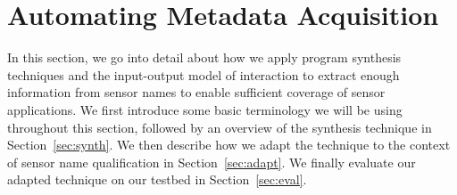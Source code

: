 \section{Automating Metadata Acquisition}
%
%

In this section, we go into detail about how we apply program synthesis techniques and the input-output model of interaction to extract enough information from sensor names to enable sufficient coverage of sensor applications. We first introduce some basic terminology we will be using throughout this section, followed by an overview of the synthesis technique in Section~\ref{sec:synth}. We then describe how we adapt the technique to the context of sensor name qualification in Section~\ref{sec:adapt}.  We finally evaluate our adapted technique on our testbed in Section~\ref{sec:eval}.

%

